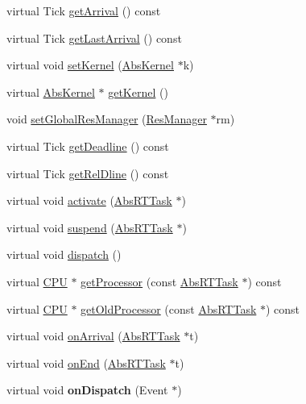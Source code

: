 \begin{DoxyCompactItemize}
virtual Tick \hyperlink{classRTSim_1_1Server_a03d4a02a990dba33d3c90207ad4bd152}{get\+Arrival} () const 
\item 
virtual Tick \hyperlink{classRTSim_1_1Server_aff20fc9ec734c8ca32d73a856aca5d25}{get\+Last\+Arrival} () const 
\item 
virtual void \hyperlink{classRTSim_1_1Server_a625146752bb0a0dbcb6bbd3a81e826a0}{set\+Kernel} (\hyperlink{classRTSim_1_1AbsKernel}{Abs\+Kernel} $\ast$k)
\item 
virtual \hyperlink{classRTSim_1_1AbsKernel}{Abs\+Kernel} $\ast$ \hyperlink{classRTSim_1_1Server_aeac84345aa67b39ec22718370ecfbf8e}{get\+Kernel} ()
\item 
void \hyperlink{classRTSim_1_1Server_ae157b61e75f672845db8a1c01e79e366}{set\+Global\+Res\+Manager} (\hyperlink{classRTSim_1_1ResManager}{Res\+Manager} $\ast$rm)
\item 
virtual Tick \hyperlink{classRTSim_1_1Server_ad2116a0eb2b9c41fbc8130a901e7867e}{get\+Deadline} () const 
\item 
virtual Tick \hyperlink{classRTSim_1_1Server_a661e22db2cfcdddc7e22c043f79eaa74}{get\+Rel\+Dline} () const 
\item 
virtual void \hyperlink{classRTSim_1_1Server_a1e80dc262500cad03877b16aec5d74d5}{activate} (\hyperlink{classRTSim_1_1AbsRTTask}{Abs\+R\+T\+Task} $\ast$)
\item 
virtual void \hyperlink{classRTSim_1_1Server_a331017a70b4fdd53aed45bbd96726a08}{suspend} (\hyperlink{classRTSim_1_1AbsRTTask}{Abs\+R\+T\+Task} $\ast$)
\item 
virtual void \hyperlink{classRTSim_1_1Server_a5befba12bcb9642de20f4a5553fa7eed}{dispatch} ()
\item 
virtual \hyperlink{classRTSim_1_1CPU}{C\+PU} $\ast$ \hyperlink{classRTSim_1_1Server_a826e9b88fe242e6094cb1671ce0e9cea}{get\+Processor} (const \hyperlink{classRTSim_1_1AbsRTTask}{Abs\+R\+T\+Task} $\ast$) const 
\item 
virtual \hyperlink{classRTSim_1_1CPU}{C\+PU} $\ast$ \hyperlink{classRTSim_1_1Server_aa9ac1d7d7b850a266a607cec9d454b13}{get\+Old\+Processor} (const \hyperlink{classRTSim_1_1AbsRTTask}{Abs\+R\+T\+Task} $\ast$) const 
\item 
virtual void \hyperlink{classRTSim_1_1Server_a777883d417bd4d18e8dfeff809616644}{on\+Arrival} (\hyperlink{classRTSim_1_1AbsRTTask}{Abs\+R\+T\+Task} $\ast$t)
\item 
virtual void \hyperlink{classRTSim_1_1Server_ade06774c1c175b776c6f65da5ab8fcc8}{on\+End} (\hyperlink{classRTSim_1_1AbsRTTask}{Abs\+R\+T\+Task} $\ast$t)
\item 
virtual void {\bfseries on\+Dispatch} (Event $\ast$)\hypertarget{classRTSim_1_1Server_a1ca4b735e0777b5ec2fe629acbef616d}{}\label{classRTSim_1_1Server_a1ca4b735e0777b5ec2fe629acbef616d}


\end{DoxyCompactItemize}
